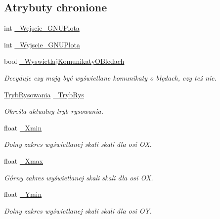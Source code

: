 \subsection*{Atrybuty chronione}
\begin{DoxyCompactItemize}
\item 
int \hyperlink{class_pz_g_1_1_lacze_do_g_n_u_plota_adc3a2250216c2473a61da379da70b2d7}{\+\_\+\+Wejscie\+\_\+\+G\+N\+U\+Plota}
\item 
int \hyperlink{class_pz_g_1_1_lacze_do_g_n_u_plota_a7d05a4767a35ee494d59724bb740dbc2}{\+\_\+\+Wyjscie\+\_\+\+G\+N\+U\+Plota}
\item 
bool \hyperlink{class_pz_g_1_1_lacze_do_g_n_u_plota_a2f2800f14ebfe1caef0b4d30c410a7fe}{\+\_\+\+Wyswietlaj\+Komunikaty\+O\+Bledach}
\begin{DoxyCompactList}\small\item\em Decyduje czy mają być wyświetlane komunikaty o błędach, czy też nie. \end{DoxyCompactList}\item 
\hyperlink{namespace_pz_g_aeedae1ef10c66d720f9e89de408ca4ca}{Tryb\+Rysowania} \hyperlink{class_pz_g_1_1_lacze_do_g_n_u_plota_a00e3a51bb47d3fb26eee875dc48215db}{\+\_\+\+Tryb\+Rys}
\begin{DoxyCompactList}\small\item\em Określa aktualny tryb rysowania. \end{DoxyCompactList}\item 
float \hyperlink{class_pz_g_1_1_lacze_do_g_n_u_plota_a69d530edfe769e38448972e897456deb}{\+\_\+\+Xmin}
\begin{DoxyCompactList}\small\item\em Dolny zakres wyświetlanej skali skali dla osi {\itshape OX}. \end{DoxyCompactList}\item 
float \hyperlink{class_pz_g_1_1_lacze_do_g_n_u_plota_a847e00678a413ab076ccbcb7eba3ae58}{\+\_\+\+Xmax}
\begin{DoxyCompactList}\small\item\em Górny zakres wyświetlanej skali skali dla osi {\itshape OX}. \end{DoxyCompactList}\item 
float \hyperlink{class_pz_g_1_1_lacze_do_g_n_u_plota_abc555fd6b82b0d5c9efb4802b58dc317}{\+\_\+\+Ymin}
\begin{DoxyCompactList}\small\item\em Dolny zakres wyświetlanej skali skali dla osi {\itshape OY}. \end{DoxyCompactList}\item 

\end{DoxyCompactItemize}
